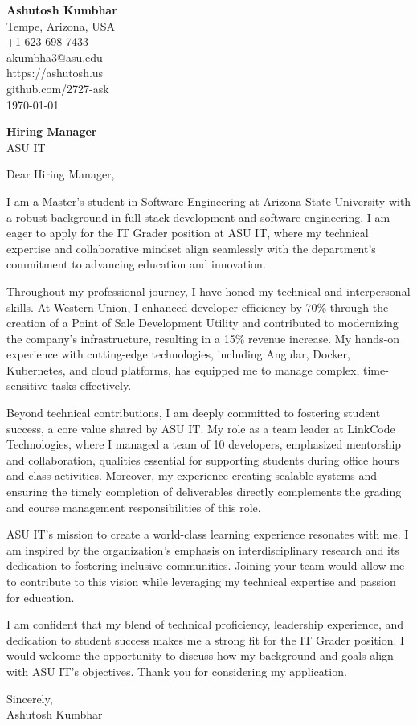\documentclass[11pt]{article}
\begin{document}
\begin{flushleft}
\textbf{Ashutosh Kumbhar} \\
Tempe, Arizona, USA \\
+1 623-698-7433 \\
akumbha3@asu.edu \\
https://ashutosh.us \\
github.com/2727-ask \\
\today
\end{flushleft}

\vspace{0.5em}

\textbf{Hiring Manager} \\
ASU IT \\

\vspace{1em}

Dear Hiring Manager,

I am a Master's student in Software Engineering at Arizona State University with a robust background in full-stack development and software engineering. I am eager to apply for the IT Grader position at ASU IT, where my technical expertise and collaborative mindset align seamlessly with the department's commitment to advancing education and innovation.

Throughout my professional journey, I have honed my technical and interpersonal skills. At Western Union, I enhanced developer efficiency by 70\% through the creation of a Point of Sale Development Utility and contributed to modernizing the company’s infrastructure, resulting in a 15\% revenue increase. My hands-on experience with cutting-edge technologies, including Angular, Docker, Kubernetes, and cloud platforms, has equipped me to manage complex, time-sensitive tasks effectively.

Beyond technical contributions, I am deeply committed to fostering student success, a core value shared by ASU IT. My role as a team leader at LinkCode Technologies, where I managed a team of 10 developers, emphasized mentorship and collaboration, qualities essential for supporting students during office hours and class activities. Moreover, my experience creating scalable systems and ensuring the timely completion of deliverables directly complements the grading and course management responsibilities of this role.

ASU IT’s mission to create a world-class learning experience resonates with me. I am inspired by the organization's emphasis on interdisciplinary research and its dedication to fostering inclusive communities. Joining your team would allow me to contribute to this vision while leveraging my technical expertise and passion for education.

I am confident that my blend of technical proficiency, leadership experience, and dedication to student success makes me a strong fit for the IT Grader position. I would welcome the opportunity to discuss how my background and goals align with ASU IT’s objectives. Thank you for considering my application.

Sincerely, \\
Ashutosh Kumbhar
\end{document}
